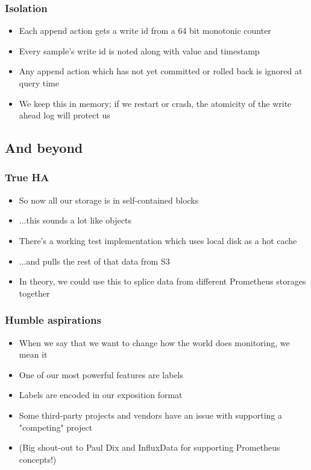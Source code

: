 \documentclass[t]{beamer}
\begin{document}
\begin{frame}
	\frametitle{Isolation}
	\begin{itemize}
		\item Each append action gets a write id from a 64 bit monotonic counter
		\item Every sample's write id is noted along with value and timestamp
		\item Any append action which has not yet committed or rolled back is ignored at query time
		\item We keep this in memory; if we restart or crash, the atomicity of the write ahead log will protect us
	\end{itemize}
\end{frame}


\subsection{And beyond}

\begin{frame}
	\frametitle{True HA}
	\begin{itemize}
		\item So now all our storage is in self-contained blocks
		\item ...this sounds a lot like objects
		\item There's a working test implementation which uses local disk as a hot cache
		\item ...and pulls the rest of that data from S3
		\item In theory, we could use this to splice data from different Prometheus storages together
	\end{itemize}
\end{frame}

\begin{frame}
	\frametitle{Humble aspirations}
	\begin{itemize}
		\item When we say that we want to change how the world does monitoring, we mean it
		\item One of our most powerful features are labels
		\item Labels are encoded in our exposition format
		\item Some third-party projects and vendors have an issue with supporting a "competing" project
		\item (Big shout-out to Paul Dix and InfluxData for supporting Prometheus concepts!)
	\end{itemize}
\end{frame}
\end{document}

